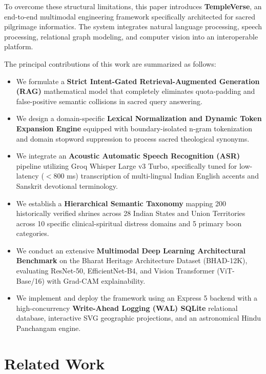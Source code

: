 \documentclass[lettersize,journal]{IEEEtran}
\begin{document}
To overcome these structural limitations, this paper introduces \textbf{TempleVerse}, an end-to-end multimodal engineering framework specifically architected for sacred pilgrimage informatics. The system integrates natural language processing, speech processing, relational graph modeling, and computer vision into an interoperable platform.

The principal contributions of this work are summarized as follows:
\begin{itemize}
    \item We formulate a \textbf{Strict Intent-Gated Retrieval-Augmented Generation (RAG)} mathematical model that completely eliminates quota-padding and false-positive semantic collisions in sacred query answering.
    \item We design a domain-specific \textbf{Lexical Normalization and Dynamic Token Expansion Engine} equipped with boundary-isolated n-gram tokenization and domain stopword suppression to process sacred theological synonyms.
    \item We integrate an \textbf{Acoustic Automatic Speech Recognition (ASR)} pipeline utilizing Groq Whisper Large v3 Turbo, specifically tuned for low-latency ($<800$ ms) transcription of multi-lingual Indian English accents and Sanskrit devotional terminology.
    \item We establish a \textbf{Hierarchical Semantic Taxonomy} mapping 200 historically verified shrines across 28 Indian States and Union Territories across 10 specific clinical-spiritual distress domains and 5 primary boon categories.
    \item We conduct an extensive \textbf{Multimodal Deep Learning Architectural Benchmark} on the Bharat Heritage Architecture Dataset (BHAD-12K), evaluating ResNet-50, EfficientNet-B4, and Vision Transformer (ViT-Base/16) with Grad-CAM explainability.
    \item We implement and deploy the framework using an Express 5 backend with a high-concurrency \textbf{Write-Ahead Logging (WAL) SQLite} relational database, interactive SVG geographic projections, and an astronomical Hindu Panchangam engine.
\end{itemize}

\section{Related Work}
\end{document}
